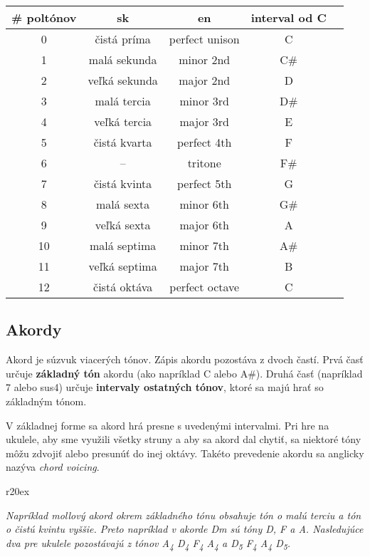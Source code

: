 \begin{center}
\begin{tabular}{ c c c c c }
    \# poltónov & sk & en & interval od C \\
    \hline
    0 & čistá príma & perfect unison & C \\
    1 & malá sekunda & minor 2nd & C\# \\
    2 & veľká sekunda & major 2nd & D \\
    3 & malá tercia & minor 3rd & D\# \\
    4 & veľká tercia & major 3rd & E \\
    5 & čistá kvarta & perfect 4th & F \\
    6 & -- & tritone & F\# \\
    7 & čistá kvinta & perfect 5th & G \\
    8 & malá sexta & minor 6th & G\# \\
    9 & veľká sexta & major 6th & A \\
    10 & malá septima & minor 7th & A\# \\
    11 & veľká septima & major 7th & B \\
    12 & čistá oktáva & perfect octave & C \\
\end{tabular}
\end{center}


\subsection*{Akordy}

Akord je súzvuk viacerých tónov. Zápis akordu pozostáva z dvoch častí. Prvá časť
určuje \textbf{základný tón} akordu (ako napríklad C alebo A\#). Druhá časť (napríklad 7 alebo sus4)
určuje \textbf{intervaly ostatných tónov}, ktoré sa majú hrať so základným tónom.

V základnej forme sa akord hrá presne s uvedenými intervalmi. Pri hre na ukulele, aby sme využili
všetky struny a aby sa akord dal chytiť, sa niektoré tóny môžu zdvojiť alebo presunúť do inej
oktávy. Takéto prevedenie akordu sa anglicky nazýva \textit{chord voicing}.

\begin{wrapfigure}{r}{20ex}
\begin{center}
\vspace{-3ex}
\smaller
\smaller
{} \qquad {}
\vspace{-3.5ex}
\end{center}
\end{wrapfigure}
\textit{%
Napríklad mollový akord okrem základného tónu obsahuje tón o malú terciu a tón o čistú kvintu vyššie. Preto napríklad v akorde Dm sú tóny D, F a A. Nasledujúce
dva  pre ukulele pozostávajú z tónov A\textsubscript{4} D\textsubscript{4} F\textsubscript{4} A\textsubscript{4}
a D\textsubscript{5} F\textsubscript{4} A\textsubscript{4} D\textsubscript{5}.
}

